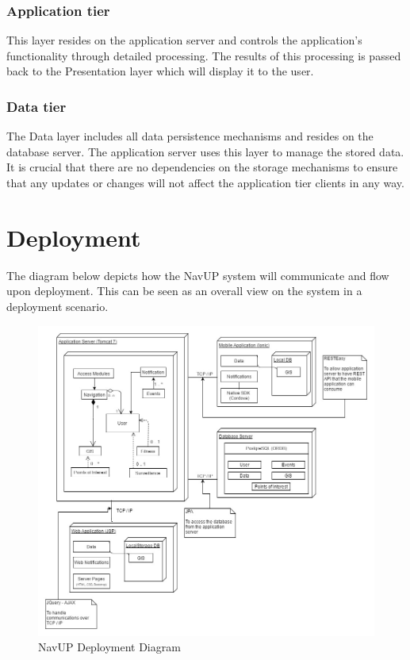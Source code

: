 \subsubsection{Application tier}
This layer resides on the application server and controls the application's functionality through detailed processing. The results of this processing is passed back to the Presentation layer which will display it to the user.

\subsubsection{Data tier}
The Data layer includes all data persistence mechanisms and resides on the database server. The application server uses this layer to manage the stored data. It is crucial that there are no dependencies on the storage mechanisms to ensure that any updates or changes will not affect the application tier clients in any way.

\pagebreak

\section{Deployment}
The diagram below depicts how the NavUP system will communicate and flow upon deployment. This can be seen as an overall view on the system in a deployment scenario.
\begin{figure}[H]
	
	\centering
	
	\includegraphics[width=\textwidth]{img/Deployment.jpg}
	
	\caption{NavUP Deployment Diagram}
	
	\end{figure}
\pagebreak